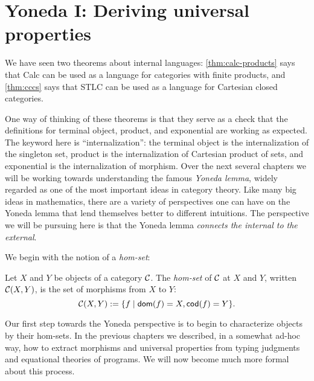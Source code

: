 \chapter{Yoneda I: Deriving universal properties}

We have seen two theorems about internal languages:
\cref{thm:calc-products} says that Calc can be used as a language for
categories with finite products, and \cref{thm:cccs} says that STLC can
be used as a language for Cartesian closed categories.

One way of thinking of these theorems is that they serve as a check that the
definitions for terminal object, product, and exponential are working as
expected.  The keyword here is ``internalization'': the terminal object is the
internalization of the singleton set, product is the internalization of
Cartesian product of sets, and exponential is the internalization of morphism.
Over the next several chapters we will be working towards understanding the 
famous \emph{Yoneda lemma}, widely regarded as one of the most important 
ideas in category theory. 
Like many big ideas in mathematics, there are a variety of perspectives one can 
have on the Yoneda lemma that lend themselves better to different intuitions.
The perspective we will be pursuing here is that 
the Yoneda lemma \emph{connects the internal to the external}.

We begin with the notion of a \emph{hom-set}:

\vspace{0.2cm}

\begin{definition}
  Let \(X\) and \(Y\) be objects of a category \(\mathcal C\).
  The \emph{hom-set} of $\mathcal C$ at $X$ and $Y$, 
  written \(\mathcal C(X,Y)\),
  is the set of morphisms from \(X\) to \(Y\):
  \[
  \mathcal C(X,Y) := \{f \mid \operatorname{\mathsf{dom}}(f) = X, \operatorname{\mathsf{cod}}(f) = Y\}.
  \]
\end{definition}

Our first step towards the Yoneda perspective is to begin to characterize
objects by their hom-sets.  In the previous chapters we described, in a somewhat
ad-hoc way, how to extract morphisms and universal properties from typing
judgments and equational theories of programs. 
We will now become much 
more formal about this process.


